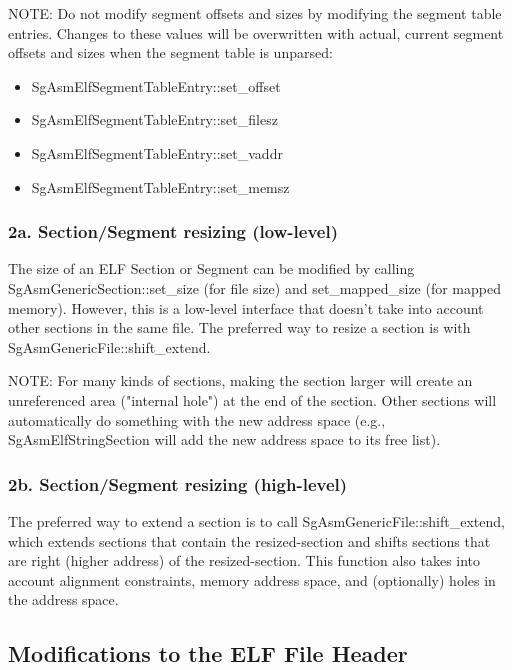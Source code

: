    NOTE: Do not modify segment offsets and sizes by modifying the segment table entries. Changes to these values will be
   overwritten with actual, current segment offsets and sizes when the segment table is unparsed:
\begin{itemize}
   \item SgAsmElfSegmentTableEntry::set\_offset
   \item SgAsmElfSegmentTableEntry::set\_filesz
   \item SgAsmElfSegmentTableEntry::set\_vaddr
   \item SgAsmElfSegmentTableEntry::set\_memsz
\end{itemize}

\subsubsection{2a. Section/Segment resizing (low-level)}

   The size of an ELF Section or Segment can be modified by calling SgAsmGenericSection::set\_size (for file size) and
   set\_mapped\_size (for mapped memory). However, this is a low-level interface that doesn't take into account other sections in
   the same file.  The preferred way to resize a section is with SgAsmGenericFile::shift\_extend.

   NOTE: For many kinds of sections, making the section larger will create an unreferenced area ("internal hole") at the end of
   the section. Other sections will automatically do something with the new address space (e.g., SgAsmElfStringSection will
   add the new address space to its free list).

\subsubsection{2b. Section/Segment resizing (high-level)}

   The preferred way to extend a section is to call SgAsmGenericFile::shift\_extend, which extends sections that contain the
   resized-section and shifts sections that are right (higher address) of the resized-section.  This function also takes into
   account alignment constraints, memory address space, and (optionally) holes in the address space.

\subsection{Modifications to the ELF File Header}

